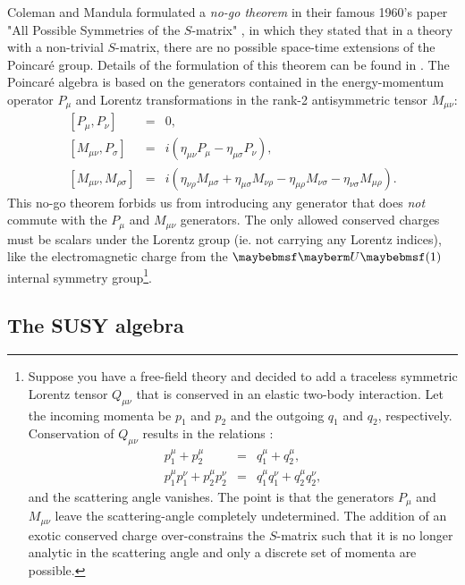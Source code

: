 Coleman and Mandula formulated a \textit{no-go theorem} in their famous 1960's paper "All Possible Symmetries of the $S$-matrix" \cite{RN94}, in which they stated that in a theory with a non-trivial $S$-matrix, there are no possible space-time extensions of the Poincar\'{e} group. Details of the formulation of this theorem can be found in \cite{RN520}. The Poincar\'{e} algebra is based on the generators contained in the energy-momentum operator $P_{\mu}$ and Lorentz transformations in the rank-2 antisymmetric tensor $M_{\mu\nu}$:
\begin{eqnarray}
\left[ P_{\mu},P_{\nu} \right] &=& 0, \\
\left[ M_{\mu\nu},P_{\sigma} \right] &=& i\left( \eta_{\mu\nu}P_{\mu} - \eta_{\mu\sigma}P_{\nu} \right), \\
\left[ M_{\mu\nu},M_{\rho\sigma} \right] &=& i\left( \eta_{\nu\rho}M_{\mu\sigma} + \eta_{\mu\sigma}M_{\nu\rho} - \eta_{\mu\rho}M_{\nu\sigma} - \eta_{\nu\sigma}M_{\mu\rho} \right).
\end{eqnarray}
This no-go theorem forbids us from introducing any generator that does \textit{not} commute with the $P_{\mu}$ and $M_{\mu\nu}$ generators. The only allowed conserved charges must be scalars under the Lorentz group (ie. not carrying any Lorentz indices), like the electromagnetic charge from the $\Ugroup{1}$ internal symmetry group\footnote{Suppose you have a free-field theory and decided to add a traceless symmetric Lorentz tensor $Q_{\mu\nu}$ that is conserved in an elastic two-body interaction. Let the incoming momenta be $p_1$ and $p_2$ and the outgoing $q_1$ and $q_2$, respectively. Conservation of $Q_{\mu\nu}$ results in the relations \cite{RN521}:
\begin{eqnarray}
p^{\mu}_1 + p^{\mu}_{2} &=& q^{\mu}_1 + q^{\mu}_2, \\
p^{\mu}_1 p^{\nu}_1 + p^{\mu}_{2}p^{\nu}_2 &=& q^{\mu}_1 q^{\nu}_1 + q^{\mu}_2 q^{\nu}_2,
\end{eqnarray}
and the scattering angle vanishes. The point is that the generators $P_{\mu}$ and $M_{\mu\nu}$ leave the scattering-angle completely undetermined. The addition of an exotic conserved charge over-constrains the $S$-matrix such that it is no longer analytic in the scattering angle and only a discrete set of momenta are possible.}. 

\subsection{The SUSY algebra}

